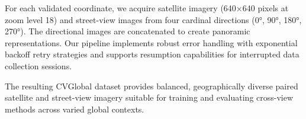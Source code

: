 For each validated coordinate, we acquire satellite imagery (640×640 pixels at zoom level 18) and street-view images from four cardinal directions (0°, 90°, 180°, 270°). The directional images are concatenated to create panoramic representations. Our pipeline implements robust error handling with exponential backoff retry strategies and supports resumption capabilities for interrupted data collection sessions.

The resulting CVGlobal dataset provides balanced, geographically diverse paired satellite and street-view imagery suitable for training and evaluating cross-view methods across varied global contexts.